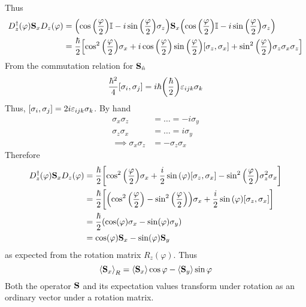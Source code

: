 \documentclass[12pt,a4paper,titlepage]{article}
\begin{document}
Thus
\begin{equation}
\begin{aligned}
D_{z}^{\dagger}(\varphi)\vb{S}_{x}D_{z}(\varphi)&=\qty(\cos\qty(\frac{\varphi}{2})\mathbb{I}-i\sin\qty(\frac{\varphi}{2})\sigma_{z})\vb{S}_{x}\qty(\cos\qty(\frac{\varphi}{2})\mathbb{I}-i\sin\qty(\frac{\varphi}{2})\sigma_{z})\\
&=\frac{\hbar}{2}\qty[\cos^{2}\qty(\frac{\varphi}{2})\sigma_{x}+i\cos\qty(\frac{\varphi}{2})\sin\qty(\frac{\varphi}{2})\comm{\sigma_{z}}{\sigma_{x}}+\sin^{2}\qty(\frac{\varphi}{2})\sigma_{z}\sigma_{x}\sigma_{z}]
\end{aligned}
\end{equation}
From the commutation relation for $\vb{S}_{\hat{n}}$
\begin{equation}
\frac{\hbar^{2}}{4}\comm{\sigma_{i}}{\sigma_{j}}=i\hbar\qty(\frac{\hbar}{2})\varepsilon_{ijk}\sigma_{k}
\end{equation}
Thus, $\comm{\sigma_{i}}{\sigma_{j}}=2i\varepsilon_{ijk}\sigma_{k}$. By hand
\begin{equation}
\begin{aligned}
\sigma_{x}\sigma_{z}&=\ldots=-i\sigma_{y}\\
\sigma_{z}\sigma_{x}&=\ldots=i\sigma_{y}\\
\implies \sigma_{x}\sigma_{z}&=-\sigma_{z}\sigma_{x}
\end{aligned}
\end{equation}
Therefore
\begin{equation}
\begin{aligned}
D_{z}^{\dagger}(\varphi)\vb{S}_{x}D_{z}(\varphi)&=\frac{\hbar}{2}\qty[\cos^{2}\qty(\frac{\varphi}{2})\sigma_{x}+\frac{i}{2}\sin\qty(\varphi)\comm{\sigma_{z}}{\sigma_{x}}-\sin^{2}\qty(\frac{\varphi}{2})\sigma_{z}^{2}\sigma_{x}]\\
&=\frac{\hbar}{2}\qty[\qty(\cos^{2}\qty(\frac{\varphi}{2})-\sin^{2}\qty(\frac{\varphi}{2}))\sigma_{x}+\frac{i}{2}\sin\qty(\varphi)\comm{\sigma_{z}}{\sigma_{x}}]\\
&=\frac{\hbar}{2}\qty(\cos(\varphi)\sigma_{x}-\sin(\varphi)\sigma_{y})\\
&=\cos(\varphi)\vb{S}_{x}-\sin(\varphi)\vb{S}_{y}
\end{aligned}
\end{equation}
as expected from the rotation matrix $R_{z}(\varphi)$. Thus
\begin{equation}
\expval{\vb{S}_{x}}_{R}=\expval{\vb{S}_{x}}\cos\varphi-\expval{\vb{S}_{y}}\sin\varphi
\end{equation}
Both the operator $\vb{S}$ and its expectation values transform under rotation as an ordinary vector under a rotation matrix.
\end{document}
